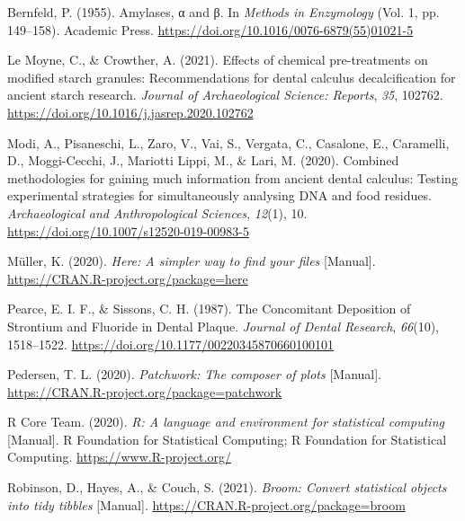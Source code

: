 \documentclass[
  letterpaper,
]{book}
\newlength{\cslhangindent}
\newlength{\cslentryspacingunit} %
\newenvironment{CSLReferences}[2] %
 {%
  \setlength{\parindent}{0pt}
  \ifodd #1
  \let\oldpar\par
  \def\par{\hangindent=\cslhangindent\oldpar}
  \fi
  \setlength{\parskip}{#2\cslentryspacingunit}
 }%
 {}
\begin{document}
\hypertarget{refs-6}{}
\begin{CSLReferences}{1}{0}
\leavevmode{}%
Bernfeld, P. (1955). Amylases, α and β. In \emph{Methods in
{Enzymology}} (Vol. 1, pp. 149--158). {Academic Press}.
\url{https://doi.org/10.1016/0076-6879(55)01021-5}

\leavevmode{}%
Le Moyne, C., \& Crowther, A. (2021). Effects of chemical pre-treatments
on modified starch granules: {Recommendations} for dental calculus
decalcification for ancient starch research. \emph{Journal of
Archaeological Science: Reports}, \emph{35}, 102762.
\url{https://doi.org/10.1016/j.jasrep.2020.102762}

\leavevmode{}%
Modi, A., Pisaneschi, L., Zaro, V., Vai, S., Vergata, C., Casalone, E.,
Caramelli, D., Moggi-Cecchi, J., Mariotti Lippi, M., \& Lari, M. (2020).
Combined methodologies for gaining much information from ancient dental
calculus: Testing experimental strategies for simultaneously analysing
{DNA} and food residues. \emph{Archaeological and Anthropological
Sciences}, \emph{12}(1), 10.
\url{https://doi.org/10.1007/s12520-019-00983-5}

\leavevmode{}%
Müller, K. (2020). \emph{Here: {A} simpler way to find your files}
{[}Manual{]}. \url{https://CRAN.R-project.org/package=here}

\leavevmode{}%
Pearce, E. I. F., \& Sissons, C. H. (1987). The {Concomitant Deposition}
of {Strontium} and {Fluoride} in {Dental Plaque}. \emph{Journal of
Dental Research}, \emph{66}(10), 1518--1522.
\url{https://doi.org/10.1177/00220345870660100101}

\leavevmode{}%
Pedersen, T. L. (2020). \emph{Patchwork: {The} composer of plots}
{[}Manual{]}. \url{https://CRAN.R-project.org/package=patchwork}

\leavevmode{}%
R Core Team. (2020). \emph{R: {A} language and environment for
statistical computing} {[}Manual{]}. {R Foundation for Statistical
Computing}; {R Foundation for Statistical Computing}.
\url{https://www.R-project.org/}

\leavevmode{}%
Robinson, D., Hayes, A., \& Couch, S. (2021). \emph{Broom: {Convert}
statistical objects into tidy tibbles} {[}Manual{]}.
\url{https://CRAN.R-project.org/package=broom}


\end{CSLReferences}
\end{document}
